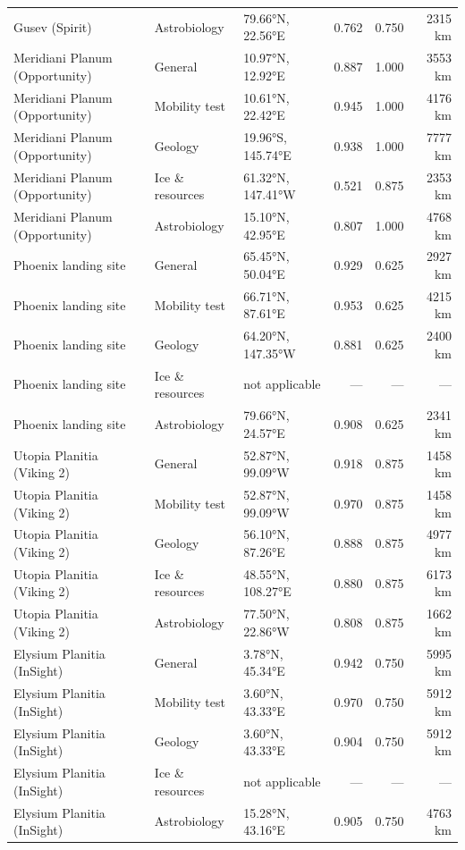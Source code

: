 \begin{table}[ht]
\begin{tabular}{lllrrr}
Gusev (Spirit) & Astrobiology & 79.66°N, 22.56°E & 0.762 & 0.750 & 2315 km \\
Meridiani Planum (Opportunity) & General & 10.97°N, 12.92°E & 0.887 & 1.000 & 3553 km \\
Meridiani Planum (Opportunity) & Mobility test & 10.61°N, 22.42°E & 0.945 & 1.000 & 4176 km \\
Meridiani Planum (Opportunity) & Geology & 19.96°S, 145.74°E & 0.938 & 1.000 & 7777 km \\
Meridiani Planum (Opportunity) & Ice \& resources & 61.32°N, 147.41°W & 0.521 & 0.875 & 2353 km \\
Meridiani Planum (Opportunity) & Astrobiology & 15.10°N, 42.95°E & 0.807 & 1.000 & 4768 km \\
Phoenix landing site & General & 65.45°N, 50.04°E & 0.929 & 0.625 & 2927 km \\
Phoenix landing site & Mobility test & 66.71°N, 87.61°E & 0.953 & 0.625 & 4215 km \\
Phoenix landing site & Geology & 64.20°N, 147.35°W & 0.881 & 0.625 & 2400 km \\
Phoenix landing site & Ice \& resources & not applicable & — & — & — \\
Phoenix landing site & Astrobiology & 79.66°N, 24.57°E & 0.908 & 0.625 & 2341 km \\
Utopia Planitia (Viking 2) & General & 52.87°N, 99.09°W & 0.918 & 0.875 & 1458 km \\
Utopia Planitia (Viking 2) & Mobility test & 52.87°N, 99.09°W & 0.970 & 0.875 & 1458 km \\
Utopia Planitia (Viking 2) & Geology & 56.10°N, 87.26°E & 0.888 & 0.875 & 4977 km \\
Utopia Planitia (Viking 2) & Ice \& resources & 48.55°N, 108.27°E & 0.880 & 0.875 & 6173 km \\
Utopia Planitia (Viking 2) & Astrobiology & 77.50°N, 22.86°W & 0.808 & 0.875 & 1662 km \\
Elysium Planitia (InSight) & General & 3.78°N, 45.34°E & 0.942 & 0.750 & 5995 km \\
Elysium Planitia (InSight) & Mobility test & 3.60°N, 43.33°E & 0.970 & 0.750 & 5912 km \\
Elysium Planitia (InSight) & Geology & 3.60°N, 43.33°E & 0.904 & 0.750 & 5912 km \\
Elysium Planitia (InSight) & Ice \& resources & not applicable & — & — & — \\
Elysium Planitia (InSight) & Astrobiology & 15.28°N, 43.16°E & 0.905 & 0.750 & 4763 km \\

\end{tabular}
\end{table}
